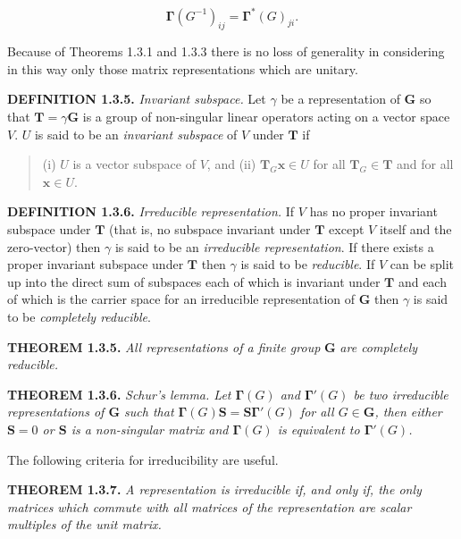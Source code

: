 \documentclass[11pt,a4paper,twoside,openright]{book}
\begin{document}
\begin{equation*}
\boldsymbol{\Gamma}(G^{-1})_{ij} = \boldsymbol{\Gamma}^{*}(G)_{ji}. \tag{1.3.10}
\end{equation*}

Because of Theorems 1.3.1 and 1.3.3 there is no loss of generality in considering in this way only those matrix representations which are unitary.

\textbf{DEFINITION 1.3.5.} \textit{Invariant subspace.} Let $\gamma$ be a representation of $\mathbf{G}$ so that $\mathbf{T} = \gamma\mathbf{G}$ is a group of non-singular linear operators acting on a vector space $V$. $U$ is said to be an \textit{invariant subspace} of $V$ under $\mathbf{T}$ if

\begin{quote}(i) $U$ is a vector subspace of $V$, and (ii) $\mathbf{T}_{G}\mathbf{x} \in U$ for all $\mathbf{T}_{G} \in \mathbf{T}$ and for all $\mathbf{x} \in U$.\end{quote}

\textbf{DEFINITION 1.3.6.} \textit{Irreducible representation.} If $V$ has no proper invariant subspace under $\mathbf{T}$ (that is, no subspace invariant under $\mathbf{T}$ except $V$ itself and the zero-vector) then $\gamma$ is said to be an \textit{irreducible representation}. If there exists a proper invariant subspace under $\mathbf{T}$ then $\gamma$ is said to be \textit{reducible}. If $V$ can be split up into the direct sum of subspaces each of which is invariant under $\mathbf{T}$ and each of which is the carrier space for an irreducible representation of $\mathbf{G}$ then $\gamma$ is said to be \textit{completely reducible}.

\textbf{THEOREM 1.3.5.} \textit{All representations of a finite group} $\mathbf{G}$ \textit{are completely reducible.}

\textbf{THEOREM 1.3.6.} \textit{Schur's lemma. Let $\boldsymbol{\Gamma}(G)$ and $\boldsymbol{\Gamma}'(G)$ be two irreducible representations of $\mathbf{G}$ such that $\boldsymbol{\Gamma}(G)\mathbf{S} = \mathbf{S}\boldsymbol{\Gamma}'(G)$ for all $G \in \mathbf{G}$, then either $\mathbf{S} = 0$ or $\mathbf{S}$ is a non-singular matrix and $\boldsymbol{\Gamma}(G)$ is equivalent to $\boldsymbol{\Gamma}'(G)$.}

The following criteria for irreducibility are useful.

\textbf{THEOREM 1.3.7.} \textit{A representation is irreducible if, and only if, the only matrices which commute with all matrices of the representation are scalar multiples of the unit matrix.}
\end{document}
